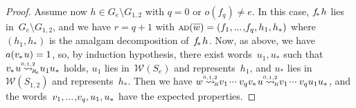 \documentclass{amsart}
\numberwithin{equation}{section}
\theoremstyle{plain}
\theoremstyle{definition}
\begin{document}
\begin{proof}
Assume now ${h} \in {G}_{e} \setminus {G}_{1,2}$ with ${q} = 0$ or ${o({{f}_{q}})} \not= {e}$. In this case, ${{f}_{\hspace{-0.3ex}*\hspace{0.2ex}}} {h}$ lies in~${G}_{e} \setminus {G}_{1,2}$, and we have ${r} = {q}+1$ with ${{\scriptstyle\mathrm{A\hspace{-0.1ex}D}}({{\overline{\vrule width0pt height5pt{w}}}})} = ({f}_1 {, ...\hspace{0.2ex},} {f}_{q}, {h}_1, {h}_*)$ where $({h}_1, {h}_*)$ is the amalgam decomposition of~${{f}_{\hspace{-0.3ex}*\hspace{0.2ex}}} {h}$. Now, as above, we have ${a({{{v}_{\hspace{-0.1ex}*\hspace{0.2ex}}} {u}})} = 1$, so, by induction hypothesis, there exist words~${u}_1, {u}_*$ such that ${{v}_{\hspace{-0.1ex}*\hspace{0.2ex}}} {u} {\mathrel{{\mathrel{\overset{\scriptscriptstyle 0,1,2}{\rightsquigarrow}}}_{\hspace{-0.9ex}{\scriptscriptstyle R}_{\hspace{-0.2ex}e}}}} {u}_1 {u}_*$ holds, ${u}_1$ lies in~${\mathcal{W}({{S}_{e}})}$ and represents~${h}_1$, and ${u}_*$ lies in~${\mathcal{W}({{S}_{1,2}})}$ and represents~${h}_*$. Then we have ${w} {\mathrel{{\mathrel{\overset{\scriptscriptstyle 0,1,2}{\rightsquigarrow}}}_{\hspace{-0.9ex}{\scriptscriptstyle R}}}} {v}_1 {\hspace{0.2ex}{\cdot}{\cdot}{\cdot}\hspace{0.5ex}} {v}_{q} {{v}_{\hspace{-0.1ex}*\hspace{0.2ex}}} {u} {\mathrel{{\mathrel{\overset{\scriptscriptstyle 0,1,2}{\rightsquigarrow}}}_{\hspace{-0.9ex}{\scriptscriptstyle R}}}} {v}_1 {\hspace{0.2ex}{\cdot}{\cdot}{\cdot}\hspace{0.5ex}} {v}_{q} {u}_1 {u}_*$, and the words~${v}_1 {, ...\hspace{0.2ex},} {v}_{q}, {u}_1, {u}_*$ have the expected properties.


\end{proof}
\end{document}
